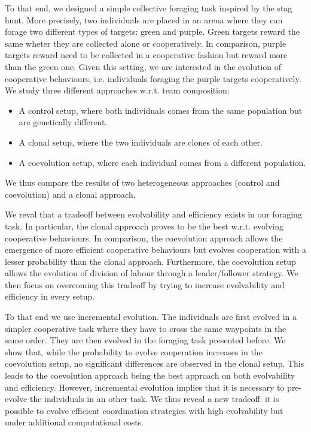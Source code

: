 
To that end, we designed a simple collective foraging task inspired by the stag hunt. More precisely, two individuals are placed in an arena where they can forage two different types of targets: green and purple. Green targets reward the same wheter they are collected alone or cooperatively. In comparison, purple targets reward need to be collected in a cooperative fashion but reward more than the green one. Given this setting, we are interested in the evolution of cooperative behaviours, i.e. individuals foraging the purple targets cooperatively. We study three different approaches w.r.t. team composition:

\begin{itemize}
  \item{A control setup, where both individuals comes from the same population but are genetically different.}
  \item{A clonal setup, where the two individuals are clones of each other.}
  \item{A coevolution setup, where each individual comes from a different population.}
\end{itemize}

We thus compare the results of two heterogeneous approaches (control and coevolution) and a clonal approach.

We reval that a tradeoff between evolvability and efficiency exists in our foraging task. In particular, the clonal approach proves to be the best w.r.t. evolving cooperative behaviours. In comparison, the coevolution approach allows the emergence of more efficient cooperative behaviours but evolves cooperation with a lesser probability than the clonal approach. Furthermore, the coevolution setup allows the evolution of division of labour through a leader/follower strategy. We then focus on overcoming this tradeoff by trying to increase evolvability and efficiency in every setup. 

To that end we use incremental evolution. The individuals are first evolved in a simpler cooperative task where they have to cross the same waypoints in the same order. They are then evolved in the foraging task presented before. We show that, while the probability to evolve cooperation increases in the coevolution setup, no significant differences are observed in the clonal setup. This leads to the coevolution approach being the best approach on both evolvability and efficiency. However, incremental evolution implies that it is necessary to pre-evolve the individuals in an other task. We thus reveal a new tradeoff: it is possible to evolve efficient coordination strategies with high evolvability but under additional computational costs.

